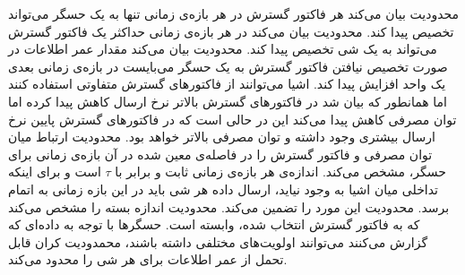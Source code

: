 محدودیت  بیان می‌کند هر فاکتور گسترش در هر بازه‌ی زمانی تنها به یک حسگر می‌تواند تخصیص پیدا کند.
محدودیت  بیان می‌کند در هر بازه‌ی زمانی حداکثر یک فاکتور گسترش می‌تواند به یک شی تخصیص پیدا کند.
محدودیت  بیان می‌کند مقدار عمر اطلاعات در صورت تخصیص نیافتن فاکتور گسترش به یک حسگر می‌بایست در بازه‌ی زمانی بعدی یک واحد افزایش پیدا کند.
اشیا می‌توانند از فاکتورهای گسترش متفاوتی استفاده کنند اما همانطور که بیان شد در فاکتورهای گسترش بالاتر نرخ ارسال کاهش پیدا کرده اما توان مصرفی کاهش پیدا می‌کند این در حالی است که
در فاکتورهای گسترش پایین نرخ ارسال بیشتری وجود داشته و توان مصرفی بالاتر خواهد بود. محدودیت  ارتباط میان توان مصرفی و فاکتور گسترش را در فاصله‌ی
معین شده در آن بازه‌ی زمانی برای حسگر، مشخص می‌کند.
اندازه‌ی هر بازه‌ی زمانی ثابت و برابر با $\tau$ است و برای اینکه تداخلی میان اشیا به وجود نیاید، ارسال داده هر شی باید در این بازه زمانی به اتمام برسد.
محدودیت  این مورد را تضمین می‌کند.
محدودیت  اندازه بسته را مشخص می‌کند که به فاکتور گسترش انتخاب شده، وابسته است.
حسگرها با توجه به داده‌ای که گزارش می‌کنند می‌توانند اولویت‌های مختلفی داشته باشند، محمدودیت  کران قابل تحمل از عمر اطلاعات برای هر شی را محدود می‌کند.

